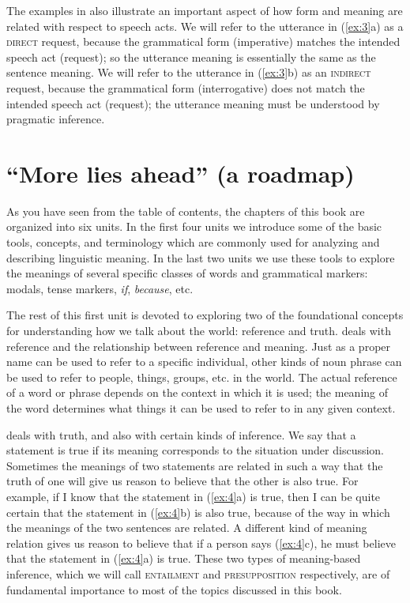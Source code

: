 The examples in  also illustrate an important aspect of how form and meaning are related with respect to speech acts. We will refer to the utterance in (\ref{ex:3}a) as a \textsc{direct} request, because the grammatical form (imperative) matches the intended speech act (request); so the utterance meaning is essentially the same as the sentence meaning. We will refer to the utterance in (\ref{ex:3}b) as an \textsc{indirect} request, because the grammatical form (interrogative) does not match the intended speech act (request); the utterance meaning must be understood by pragmatic inference.


\section{“More lies ahead” (a roadmap)}\label{sec:1.6}

As you have seen from the table of contents, the chapters of this book are organized into six units. In the first four units we introduce some of the basic tools, concepts, and terminology which are commonly used for analyzing and describing linguistic meaning. In the last two units we use these tools to explore the meanings of several specific classes of words and grammatical markers: modals, tense markers, \textit{if}, \textit{because}, etc.



The rest of this first unit is devoted to exploring two of the foundational concepts for understanding how we talk about the world: reference and truth.  deals with reference and the relationship between reference and meaning. Just as a proper name can be used to refer to a specific individual, other kinds of noun phrase can be used to refer to people, things, groups, etc. in the world. The actual reference of a word or phrase depends on the context in which it is used; the meaning of the word determines what things it can be used to refer to in any given context.



 deals with truth, and also with certain kinds of inference. We say that a statement is true if its meaning corresponds to the situation under discussion. Sometimes the meanings of two statements are related in such a way that the truth of one will give us reason to believe that the other is also true. For example, if I know that the statement in (\ref{ex:4}a) is true, then I can be quite certain that the statement in (\ref{ex:4}b) is also true, because of the way in which the meanings of the two sentences are related. A different kind of meaning relation gives us reason to believe that if a person says (\ref{ex:4}c), he must believe that the statement in (\ref{ex:4}a) is true. These two types of meaning-based inference, which we will call \textsc{entailment} and \textsc{presupposition} respectively, are of fundamental importance to most of the topics discussed in this book.



